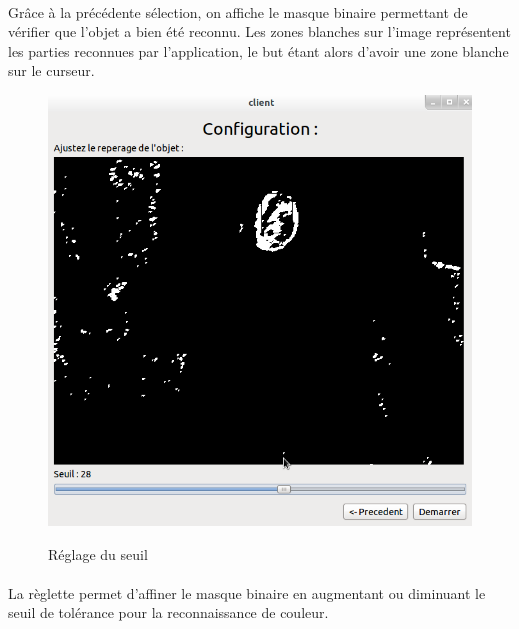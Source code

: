 \documentclass{report}
\begin{document}
				\paragraph{}
				Grâce à la précédente sélection, on affiche le masque binaire permettant de vérifier que l'objet a bien été reconnu. Les zones blanches sur l'image représentent les parties reconnues par l'application, le but étant alors d'avoir une zone blanche sur le curseur.
				\begin{figure}[!h]
						\centering
						\includegraphics[scale=0.35]{../images/Capture2.png}\\
						\caption{Réglage du seuil}
						\label{Réglage du seuil}
				\end{figure}
				\paragraph{}
				La règlette permet d'affiner le masque binaire en augmentant ou diminuant le seuil de tolérance pour la reconnaissance de couleur.
\end{document}
